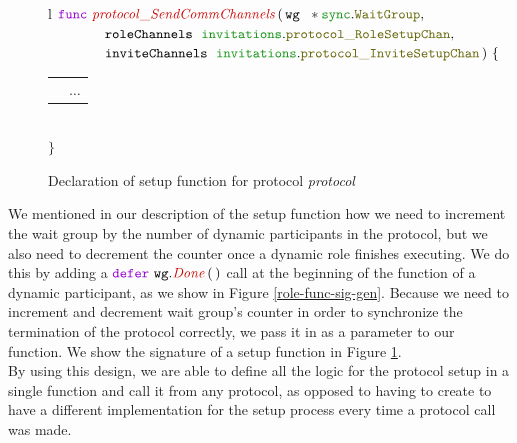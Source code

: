 \documentclass[12pt,twoside]{report}
\begin{document}
\begin{figure}[!h]
    \begin{center}
        \begin{tabular}{l}
            $\gofunc\ \functionname{protocol\_SendCommChannels} \, (\,\varname{wg}\ \;*\pkgstructaccess{sync}{WaitGroup},$\\
            
            $\qquad \qquad \varname{roleChannels}\ \;\pkgstructaccess{invitations}{protocol\_RoleSetupChan},$\\

            $\qquad \qquad \varname{inviteChannels}\ \;\pkgstructaccess{invitations}{protocol\_InviteSetupChan}\,)\ \{$\\[3pt]

            \begin{tabular}{ll}
                \indent & $\dots$\\[3.5pt]
            \end{tabular}\\[3pt]
            $\}$
        \end{tabular}
    \end{center}
    \caption{Declaration of setup function for protocol \textit{protocol}}
    \label{protocol-setup-func-gen}
\end{figure}

We mentioned in our description of the setup function how we need to increment the wait group by the number of dynamic participants in the protocol, but we also need to decrement the counter once a dynamic role finishes executing. We do this by adding a $\godefer\ \methodcall{wg}{Done}\,(\,)$ call at the beginning of the function of a dynamic participant, as we show in Figure \ref{role-func-sig-gen}. Because we need to increment and decrement wait group's counter in order to synchronize the termination of the protocol correctly, we pass it in as a parameter to our function. We show the signature of a setup function in Figure \ref{protocol-setup-func-gen}.\\

By using this design, we are able to define all the logic for the protocol setup in a single function and call it from any protocol, as opposed to having to create to have a different implementation for the setup process every time a protocol call was made.
\end{document}
